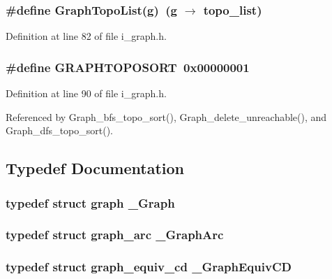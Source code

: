 \subsubsection{\setlength{\rightskip}{0pt plus 5cm}\#define Graph\-Topo\-List(g)~(g $\rightarrow$ topo\_\-list)}\label{i__graph_8h_72f3b185e03fa398053fefa392d57ed0}




Definition at line 82 of file i\_\-graph.h.
\subsubsection{\setlength{\rightskip}{0pt plus 5cm}\#define GRAPHTOPOSORT~0x00000001}\label{i__graph_8h_ad31c1d6a4bbd82015be5aea56878645}




Definition at line 90 of file i\_\-graph.h.

Referenced by Graph\_\-bfs\_\-topo\_\-sort(), Graph\_\-delete\_\-unreachable(), and Graph\_\-dfs\_\-topo\_\-sort().

\subsection{Typedef Documentation}
\subsubsection{\setlength{\rightskip}{0pt plus 5cm}typedef struct \bf{graph}  \bf{\_\-Graph}}\label{i__graph_8h_644c6dd9f80e1d0853b37c5b5fdcb077}


\subsubsection{\setlength{\rightskip}{0pt plus 5cm}typedef struct \bf{graph\_\-arc}  \bf{\_\-Graph\-Arc}}\label{i__graph_8h_c71ac0eae679b7a53ffaadd18e5bd377}


\subsubsection{\setlength{\rightskip}{0pt plus 5cm}typedef struct \bf{graph\_\-equiv\_\-cd}  \bf{\_\-Graph\-Equiv\-CD}}\label{i__graph_8h_50c7a7dd6996bb9ddd1cf1a19c1bebf9}


